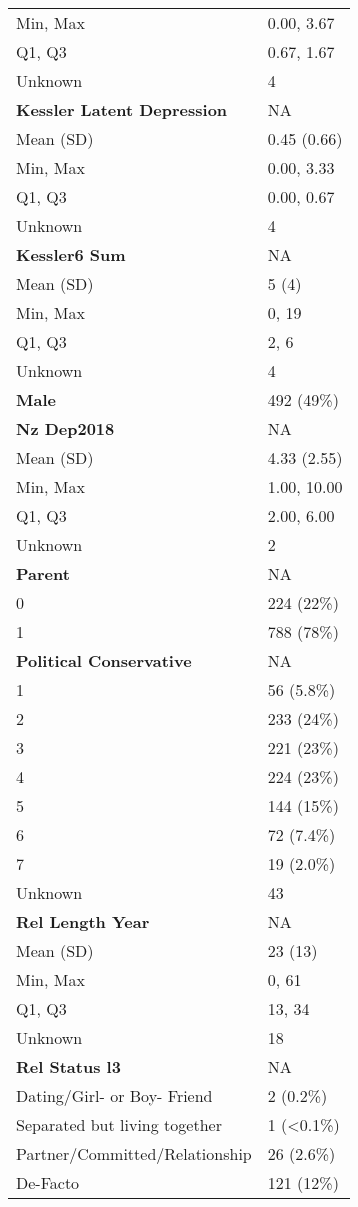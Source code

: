 \documentclass[
  single column]{article}
\begin{document}
\begin{longtable}[]{@{}ll@{}}
Min, Max & 0.00, 3.67 \\
Q1, Q3 & 0.67, 1.67 \\
Unknown & 4 \\
\textbf{Kessler Latent Depression} & NA \\
Mean (SD) & 0.45 (0.66) \\
Min, Max & 0.00, 3.33 \\
Q1, Q3 & 0.00, 0.67 \\
Unknown & 4 \\
\textbf{Kessler6 Sum} & NA \\
Mean (SD) & 5 (4) \\
Min, Max & 0, 19 \\
Q1, Q3 & 2, 6 \\
Unknown & 4 \\
\textbf{Male} & 492 (49\%) \\
\textbf{Nz Dep2018} & NA \\
Mean (SD) & 4.33 (2.55) \\
Min, Max & 1.00, 10.00 \\
Q1, Q3 & 2.00, 6.00 \\
Unknown & 2 \\
\textbf{Parent} & NA \\
0 & 224 (22\%) \\
1 & 788 (78\%) \\
\textbf{Political Conservative} & NA \\
1 & 56 (5.8\%) \\
2 & 233 (24\%) \\
3 & 221 (23\%) \\
4 & 224 (23\%) \\
5 & 144 (15\%) \\
6 & 72 (7.4\%) \\
7 & 19 (2.0\%) \\
Unknown & 43 \\
\textbf{Rel Length Year} & NA \\
Mean (SD) & 23 (13) \\
Min, Max & 0, 61 \\
Q1, Q3 & 13, 34 \\
Unknown & 18 \\
\textbf{Rel Status l3} & NA \\
Dating/Girl- or Boy- Friend & 2 (0.2\%) \\
Separated but living together & 1 (\textless0.1\%) \\
Partner/Committed/Relationship & 26 (2.6\%) \\
De-Facto & 121 (12\%) \\

\end{longtable}
\end{document}
